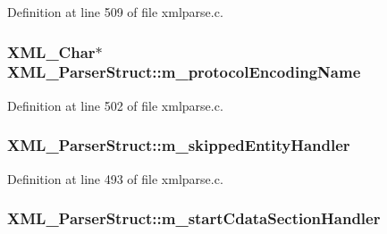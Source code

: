 Definition at line 509 of file xmlparse.\+c.

\subsubsection[{\texorpdfstring{m\+\_\+protocol\+Encoding\+Name}{m_protocolEncodingName}}]{ {\bf X\+M\+L\+\_\+\+Char}$\ast$ X\+M\+L\+\_\+\+Parser\+Struct\+::m\+\_\+protocol\+Encoding\+Name}\hypertarget{struct_x_m_l___parser_struct_a738d0643902f4abe1d27d30dce29a82d}{}\label{struct_x_m_l___parser_struct_a738d0643902f4abe1d27d30dce29a82d}


Definition at line 502 of file xmlparse.\+c.

\subsubsection[{\texorpdfstring{m\+\_\+skipped\+Entity\+Handler}{m_skippedEntityHandler}}]{ X\+M\+L\+\_\+\+Parser\+Struct\+::m\+\_\+skipped\+Entity\+Handler}\hypertarget{struct_x_m_l___parser_struct_a33d3d321ce9b22aef858d7e9861ff769}{}\label{struct_x_m_l___parser_struct_a33d3d321ce9b22aef858d7e9861ff769}


Definition at line 493 of file xmlparse.\+c.

\subsubsection[{\texorpdfstring{m\+\_\+start\+Cdata\+Section\+Handler}{m_startCdataSectionHandler}}]{ X\+M\+L\+\_\+\+Parser\+Struct\+::m\+\_\+start\+Cdata\+Section\+Handler}\hypertarget{struct_x_m_l___parser_struct_af177c35f5a57d5690ba8c20421db3bf9}{}\label{struct_x_m_l___parser_struct_af177c35f5a57d5690ba8c20421db3bf9}


